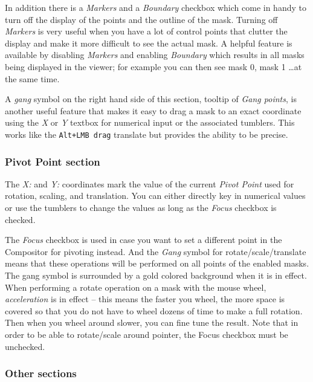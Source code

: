 In addition there is a \textit{Markers} and a \textit{Boundary} checkbox which come in handy to turn off the display of the points and the outline of the mask.  Turning off \textit{Markers} is very useful when you have a lot of control points that clutter the display and make it more difficult to see the actual mask.  A helpful feature is available by disabling \textit{Markers} and enabling \textit{Boundary} which results in all masks being displayed in the viewer; for example you can then see mask 0, mask 1 \dots at the same time.

A \textit{gang} symbol on the right hand side of this section, tooltip of \textit{Gang points}, is another useful feature that makes it easy to drag a mask to an exact coordinate using the \textit{X} or \textit{Y} textbox for numerical input or the associated tumblers.  This works like the \texttt{Alt+LMB drag} translate but provides the ability to be precise.

\subsubsection*{Pivot Point section}%
\label{ssub:pivot_point_section}

The \textit{X:} and \textit{Y:} coordinates mark the value of the current \textit{Pivot Point} used for rotation, scaling, and translation.  You can either directly key in numerical values or use the tumblers to change the values as long as the \textit{Focus} checkbox is checked.

The \textit{Focus} checkbox is used in case you want to set a different point in the Compositor for pivoting instead.  And the \textit{Gang} symbol for rotate/scale/translate means that these operations will be performed on all points of the enabled masks.  The gang symbol is surrounded by a gold colored background when it is in effect.  When performing a rotate operation on a mask with the mouse wheel, \textit{acceleration} is in effect -- this means the faster you wheel, the more space is covered so that you do not have to wheel dozens of time to make a full rotation.  Then when you wheel around slower, you can fine tune the result.
Note that in order to be able to rotate/scale around pointer, the Focus checkbox must be unchecked.

\subsubsection*{Other sections}%
\label{ssub:other_sections}

